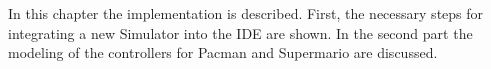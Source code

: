 
In this chapter the implementation is described. First, the necessary steps for integrating a new Simulator into the IDE are shown. In the second part the modeling of the controllers for Pacman and Supermario are discussed.




